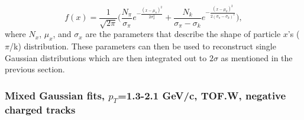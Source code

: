\begin{equation}
f(x) = \frac{1}{\sqrt{2\pi}} \bigg( \frac{N_{\pi}}{\sigma_{\pi}} e^{-\frac{(x-\mu_{\pi})^2}{2\sigma_{\pi}^{2}}} + \frac{N_{k}}{\sigma_{\pi}-\sigma_{k}} e^{-\frac{(x-\mu_{k})^2}{2(\sigma_{\pi} - \sigma_{k})^{2}}} \bigg),
\end{equation}
where $N_{x}$, $\mu_x$, and $\sigma_x$ are the parameters that describe the shape of particle $x$'s ($\pi$/k) distribution. These parameters can then be used to reconstruct single Gaussian distributions which are then integrated out to $2\sigma$ as mentioned in the previous section.

\subsubsection{Mixed Gaussian fits, $p_T$=1.3-2.1 GeV/c, TOF.W, negative charged tracks}

